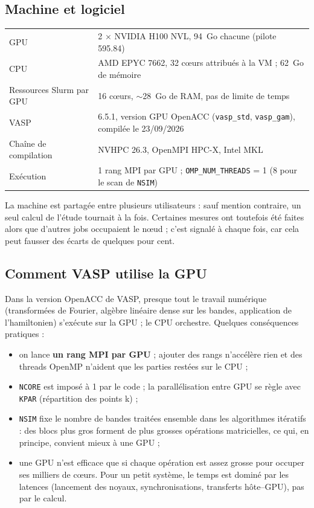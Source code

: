 \documentclass[11pt,a4paper]{article}
\begin{document}
\subsection{Machine et logiciel}

\begin{center}
\small
\begin{tabular}{@{}ll@{}}
\toprule
GPU & 2 × NVIDIA H100 NVL, \SI{94}{Go} chacune (pilote 595.84) \\
CPU & AMD EPYC 7662, 32 cœurs attribués à la VM ; \SI{62}{Go} de mémoire \\
Ressources Slurm par GPU & 16 cœurs, $\sim$\SI{28}{Go} de RAM, pas de limite de temps \\
VASP & 6.5.1, version GPU OpenACC (\texttt{vasp\_std}, \texttt{vasp\_gam}), compilée le 23/09/2026 \\
Chaîne de compilation & NVHPC 26.3, OpenMPI HPC-X, Intel MKL \\
Exécution & 1 rang MPI par GPU ; \texttt{OMP\_NUM\_THREADS} = 1 (8 pour le scan de \texttt{NSIM}) \\
\bottomrule
\end{tabular}
\end{center}

La machine est partagée entre plusieurs utilisateurs : sauf mention contraire, un seul
calcul de l'étude tournait à la fois. Certaines mesures ont toutefois été faites alors que
d'autres jobs occupaient le nœud ; c'est signalé à chaque fois, car cela peut fausser des
écarts de quelques pour cent.

\subsection{Comment VASP utilise la GPU}

Dans la version OpenACC de VASP, presque tout le travail numérique (transformées de Fourier,
algèbre linéaire dense sur les bandes, application de l'hamiltonien) s'exécute sur la GPU ;
le CPU orchestre. Quelques conséquences pratiques :
\begin{itemize}
  \item on lance \textbf{un rang MPI par GPU} ; ajouter des rangs n'accélère rien et
        des threads OpenMP n'aident que les parties restées sur le CPU ;
  \item \texttt{NCORE} est imposé à 1 par le code ; la parallélisation entre GPU se règle
        avec \texttt{KPAR} (répartition des points k) ;
  \item \texttt{NSIM} fixe le nombre de bandes traitées ensemble dans les algorithmes
        itératifs : des blocs plus gros forment de plus grosses opérations matricielles,
        ce qui, en principe, convient mieux à une GPU ;
  \item une GPU n'est efficace que si chaque opération est assez grosse pour occuper ses
        milliers de cœurs. Pour un petit système, le temps est dominé par les latences
        (lancement des noyaux, synchronisations, transferts hôte--GPU), pas par le calcul.
\end{itemize}
\end{document}
